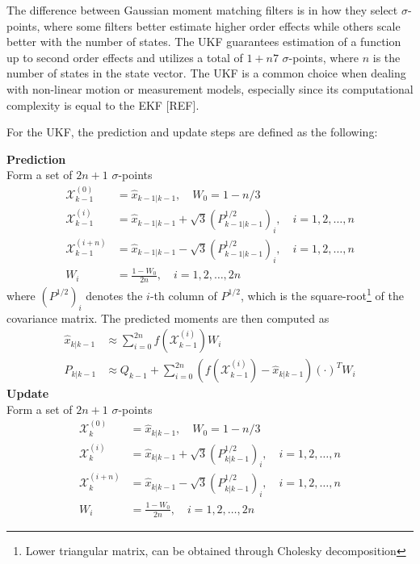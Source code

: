 The difference between Gaussian moment matching filters is in how they select $\sigma$-points, where some filters better estimate higher order effects while others scale better with the number of states. The UKF guarantees estimation of a function up to second order effects and utilizes a total of $1+n7$ $\sigma$-points, where $n$ is the number of states in the state vector. The UKF is a common choice when dealing with non-linear motion or measurement models, especially since its computational complexity is equal to the EKF [REF].

For the UKF, the prediction and update steps are defined as the following:

\textbf{Prediction} \\
Form a set of $2n+1$ $\sigma$-points
\begin{equation}
	\begin{split}
		\mathcal{X}^{(0)}_{k-1} &= \hat{x}_{k-1|k-1}, \quad W_0 = 1-n/3 \\
		\mathcal{X}^{(i)}_{k-1} &= \hat{x}_{k-1|k-1} + \sqrt{3}(P^{1/2}_{k-1|k-1})_i, \quad i = 1,2,\dots, n \\
		\mathcal{X}^{(i+n)}_{k-1} &= \hat{x}_{k-1|k-1} - \sqrt{3}(P^{1/2}_{k-1|k-1})_i, \quad i = 1,2,\dots, n \\
		W_i &= \frac{1-W_0}{2n}, \quad i = 1,2,\dots, 2n
	\end{split}
\end{equation}
where $(P^{1/2})_i$ denotes the $i$-th column of $P^{1/2}$, which is the square-root\footnote{Lower triangular matrix, can be obtained through Cholesky decomposition} of the covariance matrix. %
The predicted moments are then computed as
\begin{equation}
	\begin{split}
		\hat{x}_{k|k-1} &\approx \sum\limits_{i=0}^{2n} f(\mathcal{X}_{k-1}^{(i)})W_i \\
		P_{k|k-1} &\approx Q_{k-1} + \sum\limits_{i=0}^{2n}(f(\mathcal{X}_{k-1}^{(i)}) - \hat{x}_{k|k-1})({\cdot})^{T}W_i
	\end{split}
\end{equation}
\textbf{Update} \\
Form a set of $2n+1$ $\sigma$-points
\begin{equation}
	\begin{split}
		\mathcal{X}^{(0)}_{k} &= \hat{x}_{k|k-1}, \quad W_0 = 1-n/3 \\
		\mathcal{X}^{(i)}_{k} &= \hat{x}_{k|k-1} + \sqrt{3}(P^{1/2}_{k|k-1})_i, \quad i = 1,2,\dots, n \\
		\mathcal{X}^{(i+n)}_{k} &= \hat{x}_{k|k-1} - \sqrt{3}(P^{1/2}_{k|k-1})_i, \quad i = 1,2,\dots, n \\
		W_i &= \frac{1-W_0}{2n}, \quad i = 1,2,\dots, 2n
	\end{split}
\end{equation}

